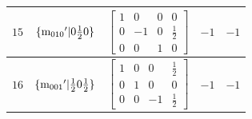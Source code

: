 \documentclass[fleqn,8pt]{jsarticle}
\begin{document}
\begin{longtable}{ccccc}
$ 15 $ & $ \{{\rm m}_{010}{}'|0 \frac{1}{2} 0\} $ & $ \begin{bmatrix} 1 & 0 & 0 & 0 \\ 0 & -1 & 0 & \frac{1}{2} \\ 0 & 0 & 1 & 0 \end{bmatrix} $ & $ -1 $ & $ -1 $ \\ \hline
$ 16 $ & $ \{{\rm m}_{001}{}'|\frac{1}{2} 0 \frac{1}{2}\} $ & $ \begin{bmatrix} 1 & 0 & 0 & \frac{1}{2} \\ 0 & 1 & 0 & 0 \\ 0 & 0 & -1 & \frac{1}{2} \end{bmatrix} $ & $ -1 $ & $ -1 $ \\
\end{longtable}
\end{document}
